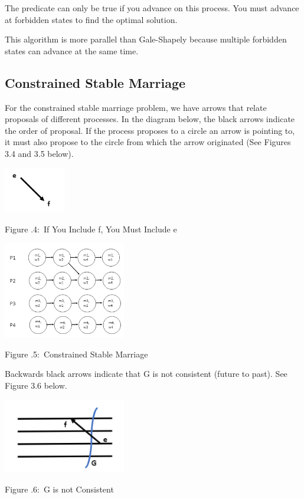 \documentclass[twoside]{article}
\newcounter{lecnum}
\newcommand{\fig}[3]{
			\vspace{#2}
			\begin{center}
			Figure \thelecnum.#1:~#3
			\end{center}
	}
\begin{document}
The predicate can only be true if you advance on this process. You must advance at forbidden states to find the optimal solution. \newline
 
This algorithm is more parallel than Gale-Shapely because multiple forbidden states can advance at the same time. \newline

\subsection{Constrained Stable Marriage}
For the constrained stable marriage problem, we have arrows that relate proposals of different processes. In the diagram below, the black arrows indicate the order of proposal. If the process proposes to a circle an arrow is pointing to, it must also propose to the circle from which the arrow originated (See Figures 3.4 and 3.5 below). \newline \newline
\begin{center}
\includegraphics[width=0.2\textwidth]{e_f.PNG}
\end{center}
\fig{4}{4}{If You Include f, You Must Include e}

\begin{center}
\includegraphics[width=0.4\textwidth]{constrained_stable_marriage.PNG}
\end{center}
\fig{5}{4}{Constrained Stable Marriage}

Backwards black arrows indicate that G is not consistent (future to past). See Figure 3.6 below. \newline

\begin{center}
\includegraphics[width=0.4\textwidth]{G_not_consistent.PNG}
\end{center}
\fig{6}{4}{G is not Consistent}
\end{document}
